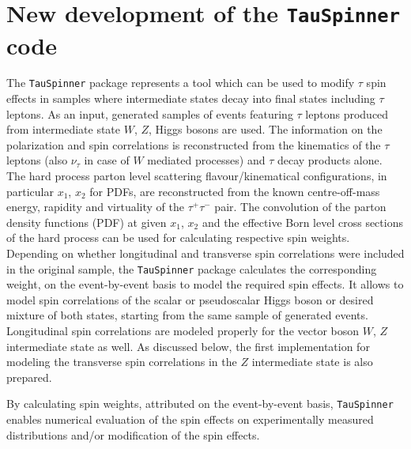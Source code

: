 \documentclass[12pt]{article}
\begin{document}
\section {New development of the {\tt TauSpinner} code}
\label{sec:Newdevelopment}

The {\tt TauSpinner} package  \cite{Czyczula:2012ny,Banerjee:2012ez, TauSpinner2014} represents 
a tool which can be used to modify $\tau$ spin effects in samples where intermediate states
decay into final states including  $\tau$ leptons. 
As an input, generated samples of events featuring $\tau$ leptons produced from intermediate state 
$W$, $Z$, Higgs bosons are used. 
The information on the polarization and spin correlations is reconstructed from the kinematics of the 
$\tau$ leptons (also $\nu_\tau$ in case of $W$ mediated processes) and $\tau$ decay products alone. 
The hard process parton level scattering flavour/kinematical configurations, in particular $x_1$, $x_2$ for PDFs, are reconstructed
from the known centre-off-mass energy,  rapidity and virtuality of the $\tau^+\tau^-$ pair. The convolution of the 
parton density functions (PDF) at given $x_1$, $x_2$ and the effective Born level cross sections of the hard process
can be used for  calculating respective spin weights. Depending on whether
longitudinal and transverse spin correlations were included  in the original sample, the {\tt TauSpinner} package calculates
the corresponding  weight, on the event-by-event basis to model the required spin effects. 
It allows to model spin correlations of the scalar
or pseudoscalar Higgs boson or desired mixture of both states, starting from the same sample of generated events. 
Longitudinal spin correlations are 
modeled properly for the vector boson  $W$, $Z$ intermediate state as well. As discussed below, the first 
implementation  for modeling the transverse spin correlations in the $Z$ intermediate state
is also prepared.

By calculating spin weights, attributed on the event-by-event basis, {\tt TauSpinner} enables numerical evaluation of 
the spin effects on experimentally measured distributions and/or modification of the spin effects.
\end{document}
